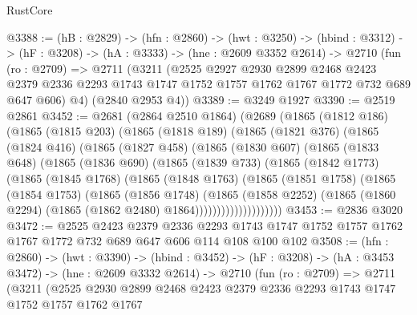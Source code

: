 \begin{lexlean}{RustCore}
\begin{coremodule}
@3388 := (hB : @2829) ->
  (hfn : @2860) ->
  (hwt : @3250) ->
  (hbind : @3312) ->
  (hF : @3208) ->
  (hA : @3333) ->
  (hne : @2609 @3352 @2614) ->
  @2710
    (fun (ro : @2709) =>
    @2711
      (@3211
        (@2525
          @2927
          @2930
          @2899
          @2468
          @2423
          @2379
          @2336
          @2293
          @1743
          @1747
          @1752
          @1757
          @1762
          @1767
          @1772
          @732
          @689
          @647
          @606)
        @4)
      (@2840 @2953 @4))
@3389 := @3249 @1927
@3390 := @2519 @2861
@3452 := @2681
    (@2864 @2510 @1864)
    (@2689
      (@1865
        (@1812 @186)
        (@1865
          (@1815 @203)
          (@1865
            (@1818 @189)
            (@1865
              (@1821 @376)
              (@1865
                (@1824 @416)
                (@1865
                  (@1827 @458)
                  (@1865
                    (@1830 @607)
                    (@1865
                      (@1833 @648)
                      (@1865
                        (@1836 @690)
                        (@1865
                          (@1839 @733)
                          (@1865
                            (@1842 @1773)
                            (@1865
                              (@1845 @1768)
                              (@1865
                                (@1848 @1763)
                                (@1865
                                  (@1851 @1758)
                                  (@1865
                                    (@1854 @1753)
                                    (@1865
                                      (@1856 @1748)
                                      (@1865
                                        (@1858 @2252)
                                        (@1865
                                          (@1860 @2294)
                                          (@1865 (@1862 @2480) @1864))))))))))))))))))))
@3453 := @2836 @3020
@3472 := @2525
    @2423
    @2379
    @2336
    @2293
    @1743
    @1747
    @1752
    @1757
    @1762
    @1767
    @1772
    @732
    @689
    @647
    @606
    @114
    @108
    @100
    @102
@3508 := (hfn : @2860) ->
  (hwt : @3390) ->
  (hbind : @3452) ->
  (hF : @3208) ->
  (hA : @3453 @3472) ->
  (hne : @2609 @3332 @2614) ->
  @2710
    (fun (ro : @2709) =>
    @2711
      (@3211
        (@2525
          @2930
          @2899
          @2468
          @2423
          @2379
          @2336
          @2293
          @1743
          @1747
          @1752
          @1757
          @1762
          @1767

\end{coremodule}
\end{lexlean}
